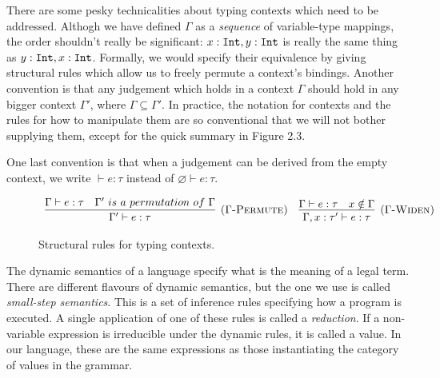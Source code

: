 There are some pesky technicalities about typing contexts which need to be addressed. Althogh we have defined $\Gamma$ as a \textit{sequence} of variable-type mappings, the order shouldn't really be significant: $x: \mathtt{Int}, y: \mathtt{Int}$ is really the same thing as $y: \mathtt{Int}, x: \mathtt{Int}$. Formally, we would specify their equivalence by giving structural rules which allow us to freely permute a context's bindings. Another convention is that any judgement which holds in a context $\Gamma$ should hold in any bigger context $\Gamma'$, where $\Gamma \subseteq \Gamma'$. In practice, the notation for contexts and the rules for how to manipulate them are so conventional that we will not bother supplying them, except for the quick summary in Figure 2.3.

One last convention is that when a judgement can be derived from the empty context, we write $\vdash e: \tau$ instead of $\varnothing \vdash e: \tau$.\\


\begin{figure}[h]

\noindent
{}

\[
\begin{array}{c}

\infer[\textsc{($\Gamma$-Permute)}]
	{\Gamma' \vdash e: \tau}
	{\Gamma \vdash e: \tau & \Gamma'~is~a~permutation~of~\Gamma}
	~~~
\infer[\textsc{($\Gamma$-Widen)}]
	{\Gamma, x: \tau' \vdash e: \tau }
	{\Gamma \vdash e: \tau & x \notin \Gamma}

	
\end{array}
\]

\vspace{-7pt}
\caption{Structural rules for typing contexts.}
\label{A sample. }
\end{figure}

The dynamic semantics of a language specify what is the meaning of a legal term. There are different flavours of dynamic semantics, but the one we use is called \textit{small-step semantics}. This is a set of inference rules specifying how a program is executed. A single application of one of these rules is called a \textit{reduction}. If a non-variable expression is irreducible under the dynamic rules, it is called a value. In our language, these are the same expressions as those instantiating the category of values in the grammar.

